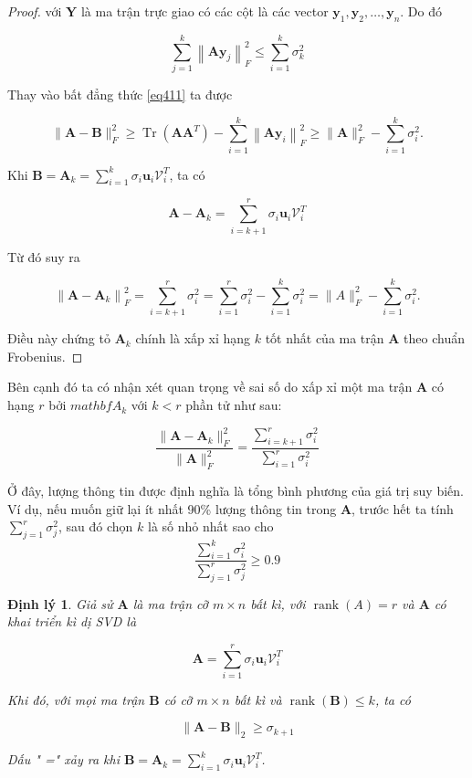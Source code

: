 \documentclass[14pt,oneside,a4paper]{report}
\newtheorem{dl}{Định lý}[section]
\numberwithin{equation}{section}
\begin{document}
\begin{proof}
với $\mathbf{Y}$ là ma trận trực giao có các cột là các vector $\mathbf{y}_{1}, \mathbf{y}_{2}, \ldots, \mathbf{y}_{n}$. Do đó

$$
\sum_{j=1}^{k}\left\|\mathbf{A y}_{j}\right\|_{F}^{2} \leqslant \sum_{i=1}^{k} \sigma_{k}^{2}
$$

Thay vào bất đẳng thức \ref{eq411} ta được

$$
\|\mathbf{A}-\mathbf{B}\|_{F}^{2} \geqslant \operatorname{Tr}\left(\mathbf{A} \mathbf{A}^{T}\right)-\sum_{i=1}^{k}\left\|\mathbf{A} \mathbf{y}_{i}\right\|_{F}^{2} \geqslant\|\mathbf{A}\|_{F}^{2}-\sum_{i=1}^{k} \sigma_{i}^{2} .
$$

Khi $\mathbf{B}=\mathbf{A}_{k}=\sum_{i=1}^{k} \sigma_{i} \mathbf{u}_{i} \mathcal{V}_{i}^{T}$, ta có

$$
\mathbf{A}-\mathbf{A}_{k}=\sum_{i=k+1}^{r} \sigma_{i} \mathbf{u}_{i} \mathcal{V}_{i}^{T}
$$

Từ đó suy ra

$$
\left\|\mathbf{A}-\mathbf{A}_{k}\right\|_{F}^{2}=\sum_{i=k+1}^{r} \sigma_{i}^{2}=\sum_{i=1}^{r} \sigma_{i}^{2}-\sum_{i=1}^{k} \sigma_{i}^{2}=\|A\|_{F}^{2}-\sum_{i=1}^{k} \sigma_{i}^{2} .
$$

Điều này chứng tỏ $\mathbf{A}_{k}$ chính là xấp xỉ hạng $k$ tốt nhất của ma trận $\mathbf{A}$ theo chuẩn Frobenius.
\end{proof}
Bên cạnh đó ta có nhận xét quan trọng về sai số do xấp xỉ một ma trận $\mathbf{A}$ có hạng $r$ bởi $mathbf{A}_{k}$ với $k < r$ phần tử như sau:

$$
\label{eqn:26_17}
\frac{\|\mathbf{A} - \mathbf{A}_k\|_F^2}{\|\mathbf{A}\|_F^2} = {\frac{\sum_{i=k+1}^{r} \sigma_{i}^{2}}{\sum_{i=1}^{r} \sigma_{i}^{2}}}
$$

Ở đây, {lượng thông tin} được định nghĩa
là tổng bình phương của giá trị suy biến. Ví dụ, nếu muốn giữ lại ít nhất
90\% lượng thông tin trong $\mathbf{A}$, trước hết ta tính $\sum_{j = 1}^r
\sigma_j^2$, sau đó chọn $k$ là số nhỏ nhất sao cho
$$
\frac{\sum_{i = 1}^k \sigma_i^2}{\sum_{j = 1}^r \sigma_j^2} \geq 0.9
$$

\begin{dl}

Giả sử $\mathbf{A}$ là ma trận cỡ $m \times n$ bất kì, với $\operatorname{rank}(A)=r$ và $\mathbf{A}$ có khai triển kì dị SVD là

$$
\mathbf{A}=\sum_{i=1}^{r} \sigma_{i} \mathbf{u}_{i} \mathcal{V}_{i}^{T}
$$

Khi đó, với mọi ma trận $\mathbf{B}$ có cỡ $m \times n$ bất kì và $\operatorname{rank}(\mathbf{B}) \leqslant k$, ta có

$$
\|\mathbf{A}-\mathbf{B}\|_{2} \geqslant \sigma_{k+1}
$$

Dấu " =" xảy ra khi $\mathbf{B}=\mathbf{A}_{k}=\sum_{i=1}^{k} \sigma_{i} \mathbf{u}_{i} \mathcal{V}_{i}^{T}$.
\end{dl}
\end{document}
